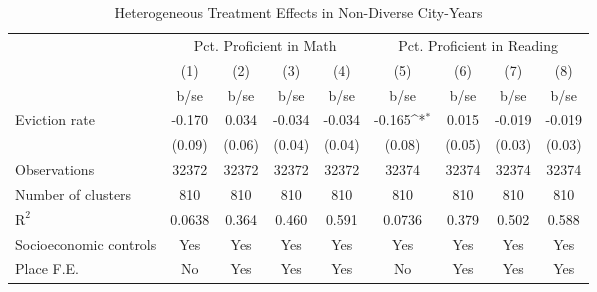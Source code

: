 \begin{table}[htbp]\centering
\def\sym#1{\ifmmode^{#1}\else\(^{#1}\)\fi}
\caption{Heterogeneous Treatment Effects in Non-Diverse City-Years}
\begin{tabular}{l*{8}{c}}
\toprule
                    &\multicolumn{4}{c}{Pct. Proficient in Math}                                            &\multicolumn{4}{c}{Pct. Proficient in Reading}                                         \\\cmidrule(lr){2-5}\cmidrule(lr){6-9}
                    &\multicolumn{1}{c}{(1)}         &\multicolumn{1}{c}{(2)}         &\multicolumn{1}{c}{(3)}         &\multicolumn{1}{c}{(4)}         &\multicolumn{1}{c}{(5)}         &\multicolumn{1}{c}{(6)}         &\multicolumn{1}{c}{(7)}         &\multicolumn{1}{c}{(8)}         \\
                    &        b/se         &        b/se         &        b/se         &        b/se         &        b/se         &        b/se         &        b/se         &        b/se         \\
\midrule
Eviction rate       &      -0.170         &       0.034         &      -0.034         &      -0.034         &      -0.165\sym{*}  &       0.015         &      -0.019         &      -0.019         \\
                    &      (0.09)         &      (0.06)         &      (0.04)         &      (0.04)         &      (0.08)         &      (0.05)         &      (0.03)         &      (0.03)         \\
\midrule
Observations        &       32372         &       32372         &       32372         &       32372         &       32374         &       32374         &       32374         &       32374         \\
Number of clusters  &         810         &         810         &         810         &         810         &         810         &         810         &         810         &         810         \\
$\text{R}^2$        &      0.0638         &       0.364         &       0.460         &       0.591         &      0.0736         &       0.379         &       0.502         &       0.588         \\
Socioeconomic controls&         Yes         &         Yes         &         Yes         &         Yes         &         Yes         &         Yes         &         Yes         &         Yes         \\
Place F.E.          &          No         &         Yes         &         Yes         &         Yes         &          No         &         Yes         &         Yes         &         Yes         \\

\end{tabular}
\end{table}
